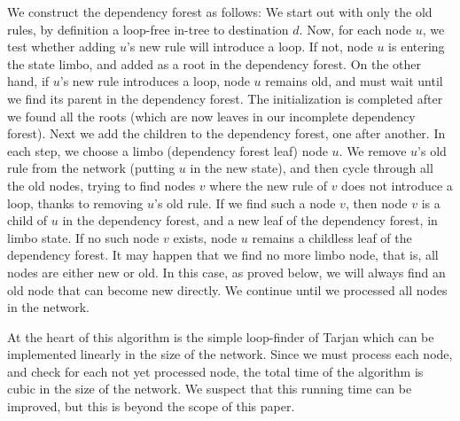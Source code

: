 We construct the dependency forest as follows: We start out with only the old rules, by definition a loop-free in-tree to destination $d$. Now, for each node $u$, we test whether adding $u$'s new rule will introduce a loop. If not, node $u$ is entering the state limbo, and added as a root in the dependency forest. On the other hand, if $u$'s new rule introduces a loop, node $u$ remains old, and must wait until we find its parent in the dependency forest. The initialization is completed after we found all the roots (which are now leaves in our incomplete dependency forest). Next we add the children to the dependency forest, one after another. In each step, we choose a limbo (dependency forest leaf) node $u$. We remove $u$'s old rule from the network (putting $u$ in the new state), and then cycle through all the old nodes, trying to find nodes $v$ where the new rule of $v$ does not introduce a loop, thanks to removing $u$'s old rule. If we find such a node $v$, then node $v$ is a child of $u$ in the dependency forest, and a new leaf of the dependency forest, in limbo state. If no such node $v$ exists, node $u$ remains a childless leaf of the dependency forest. It may happen that we find no more limbo node, that is, all nodes are either new or old. In this case, as proved below, we will always find an old node that can become new directly.
We continue until we processed all nodes in the network.

At the heart of this algorithm is the simple loop-finder of Tarjan \cite{reference_1_in_http://en.wikipedia.org/wiki/Tarjan's_strongly_connected_components_algorithm} which can be implemented linearly in the size of the network. Since we must process each node, and check for each not yet processed node, the total time of the algorithm is cubic in the size of the network. We suspect that this running time can be improved, but this is beyond the scope of this paper. 
 




